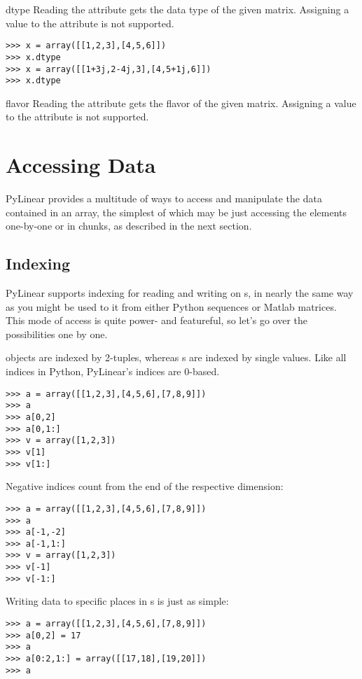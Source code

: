 \begin{memberdesc}[Array]{dtype}
  Reading the  attribute gets the data type of the given
  matrix. Assigning a value to the  attribute is not supported.
\begin{verbatim}
>>> x = array([[1,2,3],[4,5,6]])
>>> x.dtype
>>> x = array([[1+3j,2-4j,3],[4,5+1j,6]])
>>> x.dtype
\end{verbatim}
\end{memberdesc}

\begin{memberdesc}[Array]{flavor}
  Reading the  attribute gets the flavor of the given
  matrix. Assigning a value to the  attribute is not supported.
\end{memberdesc}
\section{Accessing  Data}
PyLinear provides a multitude of ways to access and manipulate the data
contained in an array, the simplest of which may be just accessing the
elements one-by-one or in chunks, as described in the next section.
\subsection{Indexing}
PyLinear supports indexing for reading and writing on s, in nearly
the same way as you might be used to it from either Python sequences or Matlab
matrices. This mode of access is quite power- and featureful, so let's go over
the possibilities one by one.

 objects are indexed by 2-tuples, whereas s are
indexed by single values. Like all indices in Python, PyLinear's indices are
0-based.
\begin{verbatim}
>>> a = array([[1,2,3],[4,5,6],[7,8,9]])
>>> a
>>> a[0,2]
>>> a[0,1:]
>>> v = array([1,2,3])
>>> v[1]
>>> v[1:]
\end{verbatim}
Negative indices count from the end of the respective dimension:
\begin{verbatim}
>>> a = array([[1,2,3],[4,5,6],[7,8,9]])
>>> a
>>> a[-1,-2]
>>> a[-1,1:]
>>> v = array([1,2,3])
>>> v[-1]
>>> v[-1:]
\end{verbatim}
Writing data to specific places in s is just as simple:
\begin{verbatim}
>>> a = array([[1,2,3],[4,5,6],[7,8,9]])
>>> a[0,2] = 17
>>> a
>>> a[0:2,1:] = array([[17,18],[19,20]])
>>> a
\end{verbatim}
